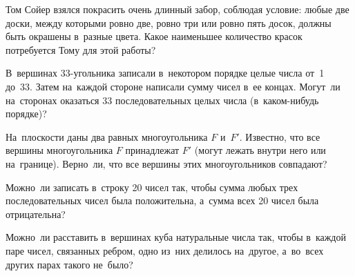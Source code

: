 \begin{problems}
\item
Том Сойер взялся покрасить очень длинный забор, соблюдая условие: любые две
доски, между которыми ровно две, ровно три или ровно пять досок, должны быть
окрашены в~разные цвета.
Какое наименьшее количество красок потребуется Тому для этой работы?

\item
В~вершинах 33-угольника записали в~некотором порядке целые числа от~1 до~33.
Затем на~каждой стороне написали сумму чисел в~ее концах.
Могут~ли на~сторонах оказаться 33 последовательных целых числа (в~каком-нибудь
порядке)?

\item
На~плоскости даны два равных многоугольника $F$ и~$F'$.
Известно, что все вершины многоугольника $F$ принадлежат $F'$
(могут лежать внутри него или на~границе).
Верно~ли, что все вершины этих многоугольников совпадают?

\item
Можно~ли записать в~строку 20 чисел так, чтобы сумма любых трех
последовательных чисел была положительна, а~сумма всех 20 чисел была
отрицательна?

\item
Можно~ли расставить в~вершинах куба натуральные числа так, чтобы в~каждой паре
чисел, связанных ребром, одно из~них делилось на~другое, а~во~всех других парах
такого не~было?

\end{problems}


